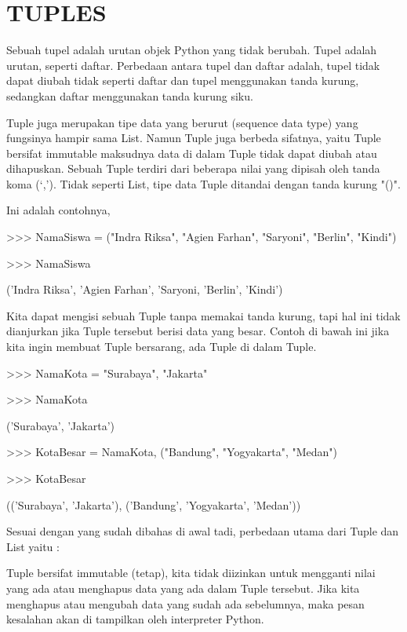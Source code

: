 

\section{TUPLES} \par
Sebuah tupel adalah urutan objek Python yang tidak berubah. Tupel adalah urutan, seperti daftar. Perbedaan antara tupel dan daftar adalah, tupel tidak dapat diubah tidak seperti daftar dan tupel menggunakan tanda kurung, sedangkan daftar menggunakan tanda kurung siku. \par
Tuple juga merupakan tipe data yang berurut (sequence data type) yang fungsinya hampir sama List. Namun Tuple juga berbeda sifatnya, yaitu Tuple bersifat immutable maksudnya data di dalam Tuple tidak dapat diubah atau dihapuskan. Sebuah Tuple terdiri dari beberapa nilai yang dipisah oleh tanda koma (‘,’). Tidak seperti List, tipe data Tuple ditandai dengan tanda kurung "()". \par
Ini adalah contohnya, \par

>>> NamaSiswa = ("Indra Riksa", "Agien Farhan", "Saryoni", "Berlin", "Kindi") \par
>>> NamaSiswa \par
('Indra Riksa', 'Agien Farhan', 'Saryoni, 'Berlin', 'Kindi') \par

Kita dapat mengisi sebuah Tuple tanpa memakai tanda kurung, tapi hal ini tidak dianjurkan jika Tuple tersebut berisi data yang besar. Contoh di bawah ini jika kita ingin membuat Tuple bersarang, ada Tuple di dalam Tuple. \par

>>> NamaKota = "Surabaya", "Jakarta" \par
>>> NamaKota \par
('Surabaya', 'Jakarta') \par
>>> KotaBesar = NamaKota, ("Bandung", "Yogyakarta", "Medan") \par
>>> KotaBesar \par
(('Surabaya', 'Jakarta'), ('Bandung', 'Yogyakarta', 'Medan')) \par
Sesuai dengan yang sudah dibahas di awal tadi, perbedaan utama dari Tuple dan List yaitu : \par
Tuple bersifat immutable (tetap), kita tidak diizinkan untuk mengganti nilai yang ada atau menghapus data yang ada dalam Tuple tersebut. Jika kita menghapus atau mengubah data yang sudah ada sebelumnya, maka pesan kesalahan akan di tampilkan oleh interpreter Python. \par

